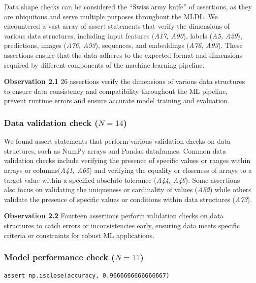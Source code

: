\documentclass[smallextended]{svjour3}       %
\newcommand{\highlight}[1]{\begin{framed}%
  \noindent#1
\end{framed}}
\begin{document}
Data shape checks can be considered the ``Swiss army knife'' of assertions, as they are ubiquitous and serve multiple purposes throughout the MLDL. We encountered a vast array of assert statements that verify the dimensions of various data structures, including input features (\emph{A17, A90}), labels (\emph{A5, A29}), predictions, images (\emph{A76, A93}), sequences, and embeddings (\emph{A76, A93}). These assertions ensure that the data adheres to the expected format and dimensions required by different components of the machine learning pipeline.

\highlight{\textbf{Observation 2.1} 26 assertions verify the dimensions of various data structures to ensure data consistency and compatibility throughout the ML pipeline, prevent runtime errors and ensure accurate model training and evaluation.}

\subsubsection{Data validation check ($N = 14$)}

We found assert statements that perform various validation checks on data structures, such as NumPy arrays and Pandas dataframes. Common data validation checks include verifying the presence of specific values or ranges within arrays or columns(\emph{A41, A65}) and verifying the equality or closeness of arrays to a target value within a specified absolute tolerance (\emph{A44, A46}). Some assertions also focus on validating the uniqueness or cardinality of values (\emph{A52}) while others validate the presence of specific values or conditions within data structures (\emph{A73}).

\highlight{\textbf{Observation 2.2} Fourteen assertions perform validation checks on data structures to catch errors or inconsistencies early, ensuring data meets specific criteria or constraints for robust ML applications.}

\subsubsection{Model performance check ($N = 11$)}\label{sec:assert-model-perf}

\begin{lstlisting}[caption={Assertion \emph{A58} used to check that the accuracy of a model is close to the specified value. The use of \lstinline{np.isclose} allows for small deviations in the accuracy thus accounting for the stochastic nature of ML models.}, label={lst:A58}]
assert np.isclose(accuracy, 0.9666666666666667)
\end{lstlisting}
\end{document}
